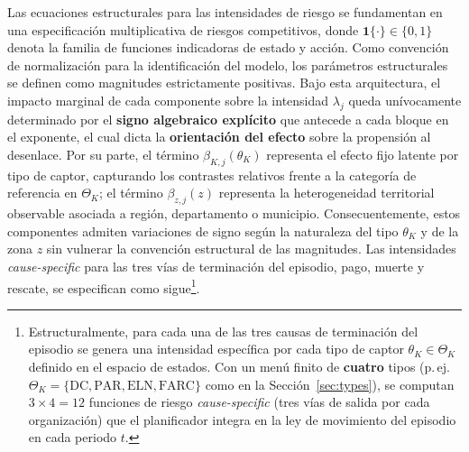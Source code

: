 \documentclass[12pt]{article}
\theoremstyle{definition}
\theoremstyle{remark}
\newcommand{\1}{\mathbf{1}}
\begin{document}
Las ecuaciones estructurales para las intensidades de riesgo se fundamentan en una especificación multiplicativa de riesgos competitivos, donde $\mathbf{1}\{\cdot\} \in \{0,1\}$ denota la familia de funciones indicadoras de estado y acción. Como convención de normalización para la identificación del modelo, los parámetros estructurales se definen como magnitudes estrictamente positivas. Bajo esta arquitectura, el impacto marginal de cada componente sobre la intensidad $\lambda_j$ queda unívocamente determinado por el \textbf{signo algebraico explícito} que antecede a cada bloque en el exponente, el cual dicta la \textbf{orientación del efecto} sobre la propensión al desenlace. Por su parte, el término $\beta_{K,j}(\theta_K)$ representa el efecto fijo latente por tipo de captor, capturando los contrastes relativos frente a la categoría de referencia en $\Theta_K$; el término $\beta_{z,j}(z)$ representa la heterogeneidad territorial observable asociada a región, departamento o municipio. Consecuentemente, estos componentes admiten variaciones de signo según la naturaleza del tipo $\theta_K$ y de la zona $z$ sin vulnerar la convención estructural de las magnitudes. Las intensidades \textit{cause-specific} para las tres vías de terminación del episodio, pago, muerte y rescate, se especifican como sigue\footnote{Estructuralmente, para cada una de las tres causas de terminación del episodio se genera una intensidad específica por cada tipo de captor $\theta_K\in\Theta_K$ definido en el espacio de estados. Con un menú finito de \textbf{cuatro} tipos \textup{(}p.\,ej.\ $\Theta_K=\{\text{DC},\text{PAR},\text{ELN},\text{FARC}\}$ como en la Sección~\ref{sec:types}\textup{)}, se computan $3\times 4=12$ funciones de riesgo \textit{cause-specific} \textup{(}tres vías de salida por cada organización\textup{)} que el planificador integra en la ley de movimiento del episodio en cada periodo $t$.}.
\end{document}

